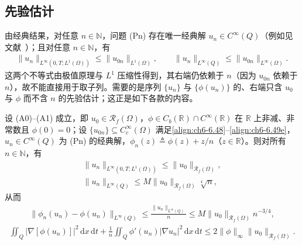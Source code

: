 \documentclass[../../main.tex]{subfiles}%
\begin{document}
\subsection{先验估计}\label{subsection:ch06-先验估计}

由经典结果，对任意 $n\in\mathbb{N}$，问题 (Pn) 存在唯一经典解 $u_n\in C^\infty(Q)$（例如见文献~\cite{ref63}）；且对任意 $n\in\mathbb{N}$，有
\begin{align}
\|u_n\|_{L^\infty(0,T;L^1(\Omega))}\leqslant\|u_{0n}\|_{L^1(\Omega)},\qquad
\|u_n\|_{L^\infty(Q)}\leqslant\|u_{0n}\|_{L^\infty(\Omega)}. \label{align:ch6-6.53}
\end{align}
这两个不等式由极值原理与 $L^1$ 压缩性得到，其右端仍依赖于 $n$（因为 $u_{0n}$ 依赖于 $n$），故不能直接用于取子列。需要的是序列 $\{u_n\}$ 与 $\{\phi(u_n)\}$ 的、右端只含 $u_0$ 与 $\phi$ 而不含 $n$ 的先验估计；这正是如下各款的内容。

\begin{lemma}\label{lemma:ch06-6.5.3}
设 (A0)--(A1) 成立，即 $u_0\in\mathscr{R}_f(\Omega)$，$\phi\in C_b(\mathbb{R})\cap C^\infty(\mathbb{R})$ 在 $\mathbb{R}$ 上非减、非常数且 $\phi(0)=0$；设 $\{u_{0n}\}\subseteq C^\infty_c(\Omega)$ 满足\eqref{align:ch6-6.48}--\eqref{align:ch6-6.49e}，$u_n\in C^\infty(Q)$ 为 (Pn) 的经典解，$\phi_n(z)\triangleq\phi(z)+z/n$（$z\in\mathbb{R}$）。则对所有 $n\in\mathbb{N}$，有
\begin{align}
\|u_n\|_{L^\infty(0,T;L^1(\Omega))}\leqslant\|u_0\|_{\mathscr{R}_f(\Omega)}, \label{align:ch6-6.54}\\
\|u_n\|_{L^\infty(Q)}\leqslant M\|u_0\|_{\mathscr{R}_f(\Omega)}\sqrt[4]{n}, \label{align:ch6-6.55}
\end{align}
从而
\begin{align}
\|\phi_n(u_n)-\phi(u_n)\|_{L^\infty(Q)}
\leqslant\frac{\|u_n\|_{L^\infty(Q)}}{n}
\leqslant M\|u_0\|_{\mathscr{R}_f(\Omega)}n^{-3/4}, \label{align:ch6-6.56}
\end{align}
\begin{align}
\iint_Q|\nabla[\phi(u_n)]|^2\,\mathrm{d}x\,\mathrm{d}t
+\frac{1}{n}\iint_Q\phi'(u_n)|\nabla u_n|^2\,\mathrm{d}x\,\mathrm{d}t
\leqslant2\|\phi\|_\infty\|u_0\|_{\mathscr{R}_f(\Omega)}. \label{align:ch6-6.57}
\end{align}
\end{lemma}
\end{document}
